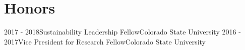 \documentclass[letterpaper]{twentysecondcv} %
\begin{document}
%


\section{Honors}
\begin{twenty} %
\twentyitem
    	{2017 - 2018}{}{Sustainability Leadership Fellow}{Colorado State University}
        {}
        { {} } 
\twentyitem
    	{2016 - 2017}{}{Vice President for Research Fellow}{Colorado State University}
        {}
        { {} }  
\end{twenty}


\end{document}
